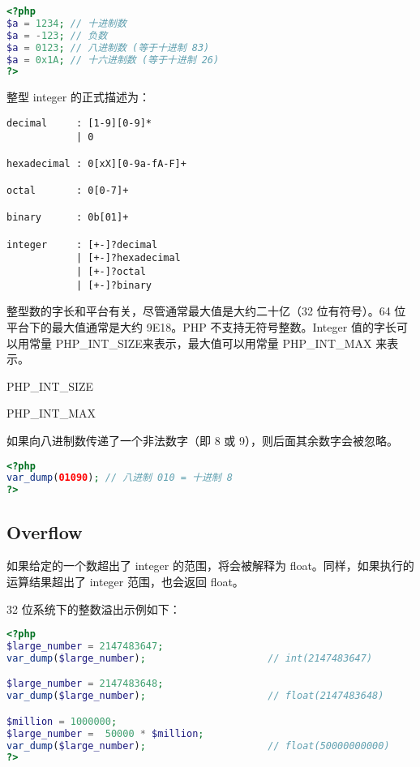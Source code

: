 \begin{lstlisting}[language=PHP]
<?php
$a = 1234; // 十进制数
$a = -123; // 负数
$a = 0123; // 八进制数 (等于十进制 83)
$a = 0x1A; // 十六进制数 (等于十进制 26)
?>
\end{lstlisting}


整型 integer 的正式描述为：

\begin{verbatim}
decimal     : [1-9][0-9]*
            | 0

hexadecimal : 0[xX][0-9a-fA-F]+

octal       : 0[0-7]+

binary      : 0b[01]+

integer     : [+-]?decimal
            | [+-]?hexadecimal
            | [+-]?octal
            | [+-]?binary
\end{verbatim}


整型数的字长和平台有关，尽管通常最大值是大约二十亿（32 位有符号）。64 位平台下的最大值通常是大约 9E18。PHP 不支持无符号整数。Integer 值的字长可以用常量 PHP\_INT\_SIZE来表示，最大值可以用常量 PHP\_INT\_MAX 来表示。

\begin{compactitem}
\item PHP\_INT\_SIZE
\item PHP\_INT\_MAX
\end{compactitem}


如果向八进制数传递了一个非法数字（即 8 或 9），则后面其余数字会被忽略。

\begin{lstlisting}[language=PHP]
<?php
var_dump(01090); // 八进制 010 = 十进制 8
?>
\end{lstlisting}

\subsection{Overflow}


如果给定的一个数超出了 integer 的范围，将会被解释为 float。同样，如果执行的运算结果超出了 integer 范围，也会返回 float。

32 位系统下的整数溢出示例如下：

\begin{lstlisting}[language=PHP]
<?php
$large_number = 2147483647;
var_dump($large_number);                     // int(2147483647)

$large_number = 2147483648;
var_dump($large_number);                     // float(2147483648)

$million = 1000000;
$large_number =  50000 * $million;
var_dump($large_number);                     // float(50000000000)
?>
\end{lstlisting}

